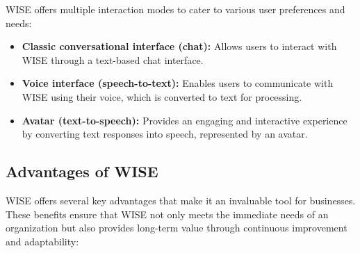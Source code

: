 WISE offers multiple interaction modes to cater to various user preferences and needs:

\begin{itemize}
    \item \textbf{Classic conversational interface (chat):} Allows users to interact with WISE through a text-based chat interface.
    \item \textbf{Voice interface (speech-to-text):} Enables users to communicate with WISE using their voice, which is converted to text for processing.
    \item \textbf{Avatar (text-to-speech):} Provides an engaging and interactive experience by converting text responses into speech, represented by an avatar.
\end{itemize}

\subsection{Advantages of WISE}

WISE offers several key advantages that make it an invaluable tool for businesses. These benefits ensure that WISE not only meets the immediate needs of an organization but also provides long-term value through continuous improvement and adaptability:

